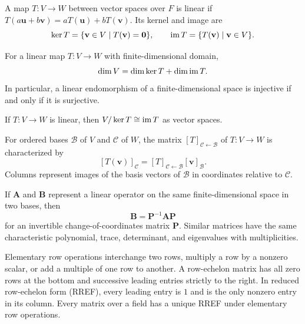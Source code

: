 \begin{definition}
A map $T\colon V\to W$ between vector spaces over $F$ is linear if $T(a\mathbf{u}+b\mathbf{v})=aT(\mathbf{u})+bT(\mathbf{v})$. Its kernel and image are
\[
 \ker T=\{\mathbf{v}\in V\mid T(\mathbf{v})=\mathbf0\},\qquad
 \operatorname{im} T=\{T(\mathbf{v})\mid\mathbf{v}\in V\}.
\]
\end{definition}

\begin{theorem}
For a linear map $T\colon V\to W$ with finite-dimensional domain,
\[
 \dim V=\dim\ker T+\dim\operatorname{im} T.
\]
In particular, a linear endomorphism of a finite-dimensional space is injective if and only if it is surjective.
\end{theorem}

\begin{theorem}
If $T\colon V\to W$ is linear, then $V/\ker T\cong\operatorname{im} T$ as vector spaces.
\end{theorem}

\begin{definition}
For ordered bases $\mathcal{B}$ of $V$ and $\mathcal{C}$ of $W$, the matrix $[T]_{\mathcal{C}\leftarrow\mathcal{B}}$ of $T\colon V\to W$ is characterized by
\[
 [T(\mathbf{v})]_{\mathcal{C}}=[T]_{\mathcal{C}\leftarrow\mathcal{B}}
 [\mathbf{v}]_{\mathcal{B}}.
\]
Columns represent images of the basis vectors of $\mathcal{B}$ in coordinates relative to $\mathcal{C}$.
\end{definition}

\begin{theorem}
If $\mathbf{A}$ and $\mathbf{B}$ represent a linear operator on the same finite-dimensional space in two bases, then
\[
 \mathbf{B}=\mathbf{P}^{-1}\mathbf{A}\mathbf{P}
\]
for an invertible change-of-coordinates matrix $\mathbf{P}$. Similar matrices have the same characteristic polynomial, trace, determinant, and eigenvalues with multiplicities.
\end{theorem}

\begin{definition}
Elementary row operations interchange two rows, multiply a row by a nonzero scalar, or add a multiple of one row to another. A row-echelon matrix has all zero rows at the bottom and successive leading entries strictly to the right. In reduced row-echelon form (RREF), every leading entry is $1$ and is the only nonzero entry in its column. Every matrix over a field has a unique RREF under elementary row operations.
\end{definition}

